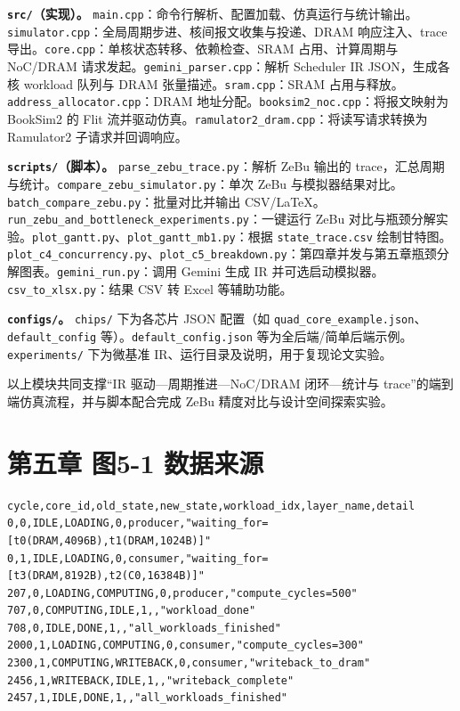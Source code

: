\textbf{\texttt{src/}（实现）。}
\texttt{main.cpp}：命令行解析、配置加载、仿真运行与统计输出。\texttt{simulator.cpp}：全局周期步进、核间报文收集与投递、DRAM 响应注入、trace 导出。\texttt{core.cpp}：单核状态转移、依赖检查、SRAM 占用、计算周期与 NoC/DRAM 请求发起。\texttt{gemini\_parser.cpp}：解析 Scheduler IR JSON，生成各核 workload 队列与 DRAM 张量描述。\texttt{sram.cpp}：SRAM 占用与释放。\texttt{address\_allocator.cpp}：DRAM 地址分配。\texttt{booksim2\_noc.cpp}：将报文映射为 BookSim2 的 Flit 流并驱动仿真。\texttt{ramulator2\_dram.cpp}：将读写请求转换为 Ramulator2 子请求并回调响应。

\textbf{\texttt{scripts/}（脚本）。}
\texttt{parse\_zebu\_trace.py}：解析 ZeBu 输出的 trace，汇总周期与统计。\texttt{compare\_zebu\_simulator.py}：单次 ZeBu 与模拟器结果对比。\texttt{batch\_compare\_zebu.py}：批量对比并输出 CSV/LaTeX。\texttt{run\_zebu\_and\_bottleneck\_experiments.py}：一键运行 ZeBu 对比与瓶颈分解实验。\texttt{plot\_gantt.py}、\texttt{plot\_gantt\_mb1.py}：根据 \texttt{state\_trace.csv} 绘制甘特图。\texttt{plot\_c4\_concurrency.py}、\texttt{plot\_c5\_breakdown.py}：第四章并发与第五章瓶颈分解图表。\texttt{gemini\_run.py}：调用 Gemini 生成 IR 并可选启动模拟器。\texttt{csv\_to\_xlsx.py}：结果 CSV 转 Excel 等辅助功能。

\textbf{\texttt{configs/}。}
\texttt{chips/} 下为各芯片 JSON 配置（如 \texttt{quad\_core\_example.json}、\texttt{default\_config} 等）。\texttt{default\_config.json} 等为全后端/简单后端示例。\texttt{experiments/} 下为微基准 IR、运行目录及说明，用于复现论文实验。

以上模块共同支撑“IR 驱动—周期推进—NoC/DRAM 闭环—统计与 trace”的端到端仿真流程，并与脚本配合完成 ZeBu 精度对比与设计空间探索实验。

\section{第五章 图5-1 数据来源}
\label{app:c5_fig1_data}

\begin{verbatim}
cycle,core_id,old_state,new_state,workload_idx,layer_name,detail
0,0,IDLE,LOADING,0,producer,"waiting_for=[t0(DRAM,4096B),t1(DRAM,1024B)]"
0,1,IDLE,LOADING,0,consumer,"waiting_for=[t3(DRAM,8192B),t2(C0,16384B)]"
207,0,LOADING,COMPUTING,0,producer,"compute_cycles=500"
707,0,COMPUTING,IDLE,1,,"workload_done"
708,0,IDLE,DONE,1,,"all_workloads_finished"
2000,1,LOADING,COMPUTING,0,consumer,"compute_cycles=300"
2300,1,COMPUTING,WRITEBACK,0,consumer,"writeback_to_dram"
2456,1,WRITEBACK,IDLE,1,,"writeback_complete"
2457,1,IDLE,DONE,1,,"all_workloads_finished"
\end{verbatim}
